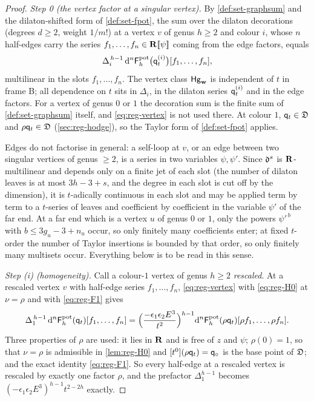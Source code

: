 \begin{proof}
\emph{Step 0 (the vertex factor at a singular vertex).} By \cref{def:set-graphsum} and the dilaton-shifted form of \cref{def:set-fpot}, the sum over the dilaton decorations (degrees $d\geq 2$, weight $1/m!$) at a vertex $v$ of genus $h\geq 2$ and colour $i$, whose $n$ half-edges carry the series $f_1,\dots,f_n\in\mathbf{R}[\![ \psi ]\!]$ coming from the edge factors, equals
\begin{equation}
\label{eq:reg-vertex}
\Delta_i^{\,h-1}\,\mathrm{d}^n\mathsf{F}^{\mathrm{pot}}_h\big(\mathsf{q}_{t}^{(i)}\big)[f_1,\dots,f_n],
\end{equation}
multilinear in the slots $f_1,\dots,f_n$. The vertex class $\mathsf{Hg}_{\mathbf{w}}$ is independent of $t$ in frame B; all dependence on $t$ sits in $\Delta_i$, in the dilaton series $\mathsf{q}_{t}^{(i)}$ and in the edge factors. For a vertex of genus $0$ or $1$ the decoration sum is the finite sum of \cref{def:set-graphsum} itself, and \eqref{eq:reg-vertex} is not used there. At colour $1$, $\mathsf{q}_{t}\in\mathfrak{D}$ and $\rho\mathsf{q}_{t}\in\mathfrak{D}$ (\cref{sec:reg-hodge}), so the Taylor form of \cref{def:set-fpot} applies.

Edges do not factorise in general: a self-loop at $v$, or an edge between two singular vertices of genus $\geq 2$, is a series in two variables $\psi,\psi'$. Since $\mathfrak{d}^s$ is $\mathbf{R}$-multilinear and depends only on a finite jet of each slot (the number of dilaton leaves is at most $3h-3+s$, and the degree in each slot is cut off by the dimension), it is $t$-adically continuous in each slot and may be applied term by term to a $t$-series of leaves and coefficient by coefficient in the variable $\psi'$ of the far end. At a far end which is a vertex $u$ of genus $0$ or $1$, only the powers $\psi'^{\,b}$ with $b\leq 3g_u-3+n_u$ occur, so only finitely many coefficients enter; at fixed $t$-order the number of Taylor insertions is bounded by that order, so only finitely many multisets occur. Everything below is to be read in this sense.

\emph{Step (i) (homogeneity).} Call a colour-$1$ vertex of genus $h\geq 2$ \emph{rescaled}. At a rescaled vertex $v$ with half-edge series $f_1,\dots,f_n$, \eqref{eq:reg-vertex} with \eqref{eq:reg-H0} at $\nu=\rho$ and with \eqref{eq:reg-F1} gives
\begin{equation}
\label{eq:reg-resc}
\Delta_1^{\,h-1}\,\mathrm{d}^n\mathsf{F}^{\mathrm{pot}}_h(\mathsf{q}_{t})[f_1,\dots,f_n]
=\Big(\frac{-\epsilon_1\epsilon_2E^3}{t^2}\Big)^{h-1}\mathrm{d}^n\mathsf{F}^{\mathrm{pot}}_h(\rho\mathsf{q}_{t})[\rho f_1,\dots,\rho f_n].
\end{equation}
Three properties of $\rho$ are used: it lies in $\mathbf{R}$ and is free of $z$ and $\psi$; $\rho(0)=1$, so that $\nu=\rho$ is admissible in \cref{lem:reg-H0} and $[t^0](\rho\mathsf{q}_{t})=\mathsf{q}_{\circ}$ is the base point of $\mathfrak{D}$; and the exact identity \eqref{eq:reg-F1}. So every half-edge at a rescaled vertex is rescaled by exactly one factor $\rho$, and the prefactor $\Delta_1^{h-1}$ becomes $(-\epsilon_1\epsilon_2E^3)^{h-1}t^{2-2h}$ exactly.


\end{proof}
